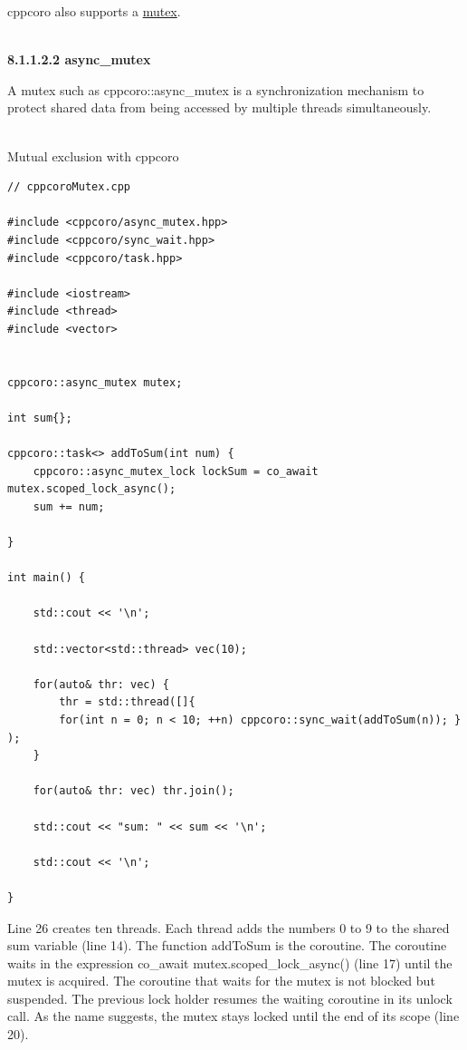 cppcoro also supports a \href{https://en.cppreference.com/w/cpp/named_req/Mutex}{mutex}.

\hspace*{\fill} \\ %
\noindent
\textbf{8.1.1.2.2\hspace{0.2cm} async\_mutex}

A mutex such as cppcoro::async\_mutex is a synchronization mechanism to protect shared data from being accessed by multiple threads simultaneously.

\hspace*{\fill} \\ %
\noindent
Mutual exclusion with cppcoro
\begin{lstlisting}[style=styleCXX]
// cppcoroMutex.cpp

#include <cppcoro/async_mutex.hpp>
#include <cppcoro/sync_wait.hpp>
#include <cppcoro/task.hpp>

#include <iostream>
#include <thread>
#include <vector>


cppcoro::async_mutex mutex;

int sum{};

cppcoro::task<> addToSum(int num) {
	cppcoro::async_mutex_lock lockSum = co_await mutex.scoped_lock_async();
	sum += num;

}

int main() {

	std::cout << '\n';
	
	std::vector<std::thread> vec(10);
	
	for(auto& thr: vec) {
		thr = std::thread([]{
		for(int n = 0; n < 10; ++n) cppcoro::sync_wait(addToSum(n)); } );
	}
	
	for(auto& thr: vec) thr.join();
	
	std::cout << "sum: " << sum << '\n';
	
	std::cout << '\n';

}
\end{lstlisting}

Line 26 creates ten threads. Each thread adds the numbers 0 to 9 to the shared sum variable (line 14). The function addToSum is the coroutine. The coroutine waits in the expression co\_await mutex.scoped\_lock\_async() (line 17) until the mutex is acquired. The coroutine that waits for the mutex is not blocked but suspended. The previous lock holder resumes the waiting coroutine in its unlock call. As the name suggests, the mutex stays locked until the end of its scope (line 20).

